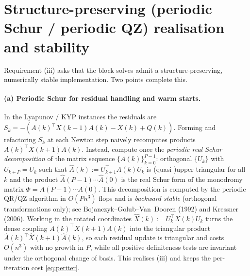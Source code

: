 \documentclass{amsart}
\begin{document}
\section{Structure-preserving (periodic Schur / periodic QZ) realisation and stability}
\label{sec:schur}

Requirement (iii) asks that the block solves admit a structure-preserving,
numerically stable implementation. Two points complete this.

\paragraph{(a) Periodic Schur for residual handling and warm starts.}
In the Lyapunov / KYP instances the residuals are
$S_k=-(A(k)^{\!\top}X(k+1)A(k)-X(k)+Q(k))$. Forming and refactoring $S_k$ at each
Newton step naively recomputes products $A(k)^{\!\top}X(k+1)A(k)$. Instead, compute
once the \emph{periodic real Schur decomposition} of the matrix sequence
$\{A(k)\}_{k=0}^{P-1}$: orthogonal $\{U_k\}$ with $U_{k+P}=U_k$ such that
$\widehat A(k):=U_{k+1}^{\!\top}A(k)U_k$ is (quasi-)upper-triangular for all $k$ and
the product $\widehat A(P-1)\cdots\widehat A(0)$ is the real Schur form of the
monodromy matrix $\Phi=A(P-1)\cdots A(0)$. This decomposition is computed by the
periodic QR/QZ algorithm in $O(Pn^3)$ flops and is \emph{backward stable}
(orthogonal transformations only); see Bojanczyk--Golub--Van~Dooren (1992) and
Kressner (2006). Working in the rotated coordinates $\widehat X(k):=U_k^{\!\top}
X(k)U_k$ turns the dense coupling $A(k)^{\!\top}X(k+1)A(k)$ into the triangular
product $\widehat A(k)^{\!\top}\widehat X(k+1)\widehat A(k)$, so each residual update
is triangular and costs $O(n^3)$ with no growth in $P$, while all positive
definiteness tests are invariant under the orthogonal change of basis. This realises
(iii) and keeps the per-iteration cost \eqref{eq:periter}.
\end{document}

